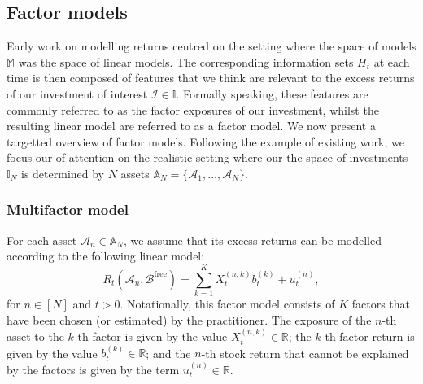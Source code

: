 \documentclass[12pt]{article}
\begin{document}
\subsection{Factor models}
Early work on modelling returns centred on the setting where the space of models $\mathbb{M}$ was the space of linear models. The corresponding information sets $H_t$ at each time is then composed of features that we think are relevant to the excess returns of our investment of interest $\mathcal{I} \in \mathbb{I}$. Formally speaking, these features are commonly referred to as the factor exposures of our investment, whilst the resulting linear model are referred to as a factor model. We now present a targetted overview of factor models. Following the example of existing work, we focus our of attention on the realistic setting where our the space of investments $\mathbb{I}_N$ is determined by $N$ assets $\mathbb{A}_N = \{\mathcal{A}_1, \dots, \mathcal{A}_N\}$.

\subsubsection{Multifactor model} For each asset $\mathcal{A}_n \in \mathbb{A}_N$, we assume that its excess returns can be modelled according to the following linear model:
\begin{equation}
	R_t(\mathcal{A}_n, \mathcal{B}^{\text{free}}) = \sum_{k=1}^K X_t^{(n, k)} b_t^{(k)} + u^{(n)}_t,
	\label{eqn:multifactor_model_asset}
\end{equation}
for $n \in [N]$ and $t>0$. Notationally, this factor model consists of $K$ factors that have been chosen (or estimated) by the practitioner. The exposure of the $n$-th asset to the $k$-th factor is given by the value $X_t^{{(n, k)}} \in \mathbb{R}$; the $k$-th factor return is given by the value $b_t^{(k)} \in \mathbb{R}$; and the $n$-th stock return that cannot be explained by the factors is given by the term $u_t^{(n)} \in \mathbb{R}$.
\end{document}
